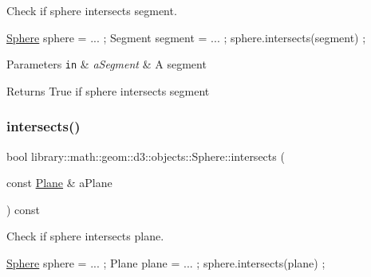 Check if sphere intersects segment. 


\begin{DoxyCode}
\hyperlink{classlibrary_1_1math_1_1geom_1_1d3_1_1objects_1_1_sphere_a55dccc8ea16ee55cd7694c26afa8ea39}{Sphere} sphere = ... ;
Segment segment = ... ;
sphere.intersects(segment) ;
\end{DoxyCode}



\begin{DoxyParams}[1]{Parameters}
\mbox{\tt in}  & {\em a\+Segment} & A segment \\
\hline
\end{DoxyParams}
\begin{DoxyReturn}{Returns}
True if sphere intersects segment 
\end{DoxyReturn}
\mbox{\label{classlibrary_1_1math_1_1geom_1_1d3_1_1objects_1_1_sphere_aa0893ce62c0798552353338aad0b8da4}} 
\subsubsection{\texorpdfstring{intersects()}{intersects()}\hspace{0.1cm}{\footnotesize\ttfamily [6/8]}}
{\footnotesize\ttfamily bool library\+::math\+::geom\+::d3\+::objects\+::\+Sphere\+::intersects (\begin{DoxyParamCaption}\item[{const \hyperlink{classlibrary_1_1math_1_1geom_1_1d3_1_1objects_1_1_plane}{Plane} \&}]{a\+Plane }\end{DoxyParamCaption}) const}



Check if sphere intersects plane. 


\begin{DoxyCode}
\hyperlink{classlibrary_1_1math_1_1geom_1_1d3_1_1objects_1_1_sphere_a55dccc8ea16ee55cd7694c26afa8ea39}{Sphere} sphere = ... ;
Plane plane = ... ;
sphere.intersects(plane) ;
\end{DoxyCode}



